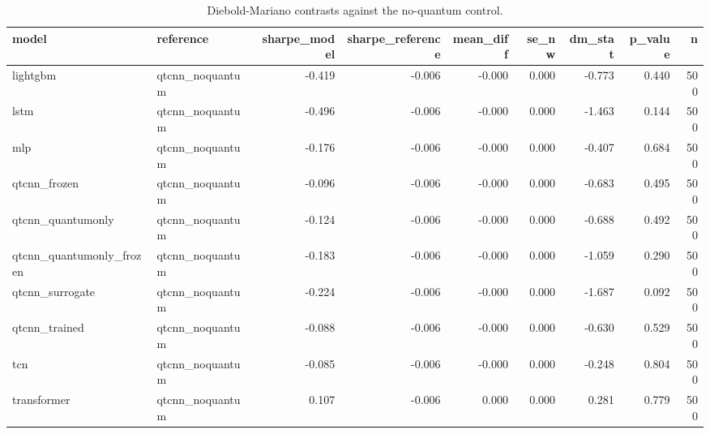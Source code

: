 \begin{table}[t]
\caption{Diebold-Mariano contrasts against the no-quantum control.}
\label{tab:ablation}
\begin{tabular}{llrrrrrrr}
\toprule
model & reference & sharpe\_model & sharpe\_reference & mean\_diff & se\_nw & dm\_stat & p\_value & n \\
\midrule
lightgbm & qtcnn\_noquantum & -0.419 & -0.006 & -0.000 & 0.000 & -0.773 & 0.440 & 500 \\
lstm & qtcnn\_noquantum & -0.496 & -0.006 & -0.000 & 0.000 & -1.463 & 0.144 & 500 \\
mlp & qtcnn\_noquantum & -0.176 & -0.006 & -0.000 & 0.000 & -0.407 & 0.684 & 500 \\
qtcnn\_frozen & qtcnn\_noquantum & -0.096 & -0.006 & -0.000 & 0.000 & -0.683 & 0.495 & 500 \\
qtcnn\_quantumonly & qtcnn\_noquantum & -0.124 & -0.006 & -0.000 & 0.000 & -0.688 & 0.492 & 500 \\
qtcnn\_quantumonly\_frozen & qtcnn\_noquantum & -0.183 & -0.006 & -0.000 & 0.000 & -1.059 & 0.290 & 500 \\
qtcnn\_surrogate & qtcnn\_noquantum & -0.224 & -0.006 & -0.000 & 0.000 & -1.687 & 0.092 & 500 \\
qtcnn\_trained & qtcnn\_noquantum & -0.088 & -0.006 & -0.000 & 0.000 & -0.630 & 0.529 & 500 \\
tcn & qtcnn\_noquantum & -0.085 & -0.006 & -0.000 & 0.000 & -0.248 & 0.804 & 500 \\
transformer & qtcnn\_noquantum & 0.107 & -0.006 & 0.000 & 0.000 & 0.281 & 0.779 & 500 \\
\bottomrule
\end{tabular}
\end{table}
